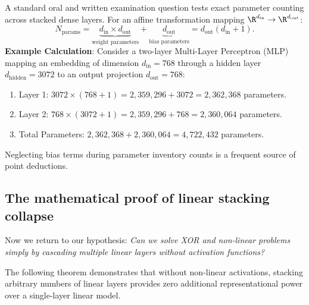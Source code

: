 \documentclass[../../main.tex]{subfiles}
\begin{document}
\begin{examinsight}
A standard oral and written examination question tests exact parameter counting across stacked dense layers. For an affine transformation mapping $\R^{d_{\text{in}}} \to \R^{d_{\text{out}}}$:
\begin{equation}
\label{eq:param_count_formula}
N_{\text{params}} = \underbrace{d_{\text{in}} \times d_{\text{out}}}_{\text{weight parameters}} + \underbrace{d_{\text{out}}}_{\text{bias parameters}} = d_{\text{out}}(d_{\text{in}} + 1).
\end{equation}
\textbf{Example Calculation}: Consider a two-layer Multi-Layer Perceptron (MLP) mapping an embedding of dimension $d_{\text{in}} = 768$ through a hidden layer $d_{\text{hidden}} = 3072$ to an output projection $d_{\text{out}} = 768$:
\begin{enumerate}
    \item Layer 1: $3072 \times (768 + 1) = 2{,}359{,}296 + 3072 = 2{,}362{,}368$ parameters.
    \item Layer 2: $768 \times (3072 + 1) = 2{,}359{,}296 + 768 = 2{,}360{,}064$ parameters.
    \item Total Parameters: $2{,}362{,}368 + 2{,}360{,}064 = 4{,}722{,}432$ parameters.
\end{enumerate}
Neglecting bias terms during parameter inventory counts is a frequent source of point deductions.
\end{examinsight}

\subsection{The mathematical proof of linear stacking collapse}
Now we return to our hypothesis: \emph{Can we solve XOR and non-linear problems simply by cascading multiple linear layers without activation functions?}

The following theorem demonstrates that without non-linear activations, stacking arbitrary numbers of linear layers provides zero additional representational power over a single-layer linear model.
\end{document}
